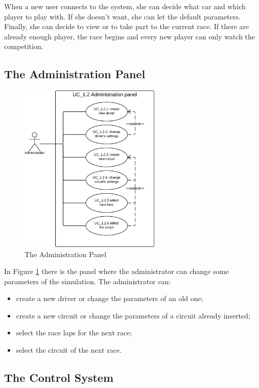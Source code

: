 When a new user connects to the system, she can decide what car and which player to play with. If she doesn't want, she can let the default parameters. Finally, she can decide to view or to take part to the current race. If there are already enough player, the race begins and every new player can only watch the competition.

\subsection{The Administration Panel}

\begin{figure}[H]
\centering %
\includegraphics[width=0.6\textwidth]{./img/UML/AdministrationPanel.png}
\caption{The Administration Panel}
\label{fig:AdministrationPanel}
\end{figure}

In Figure \ref{fig:AdministrationPanel} there is the panel where the administrator can change some parameters of the simulation. The administrator can:
\begin{itemize}
\item create a new driver or change the parameters of an old one;
\item create a new circuit or change the parameters of a circuit already inserted;
\item select the race laps for the next race;
\item select the circuit of the next race.
\end{itemize}

\subsection{The Control System}

